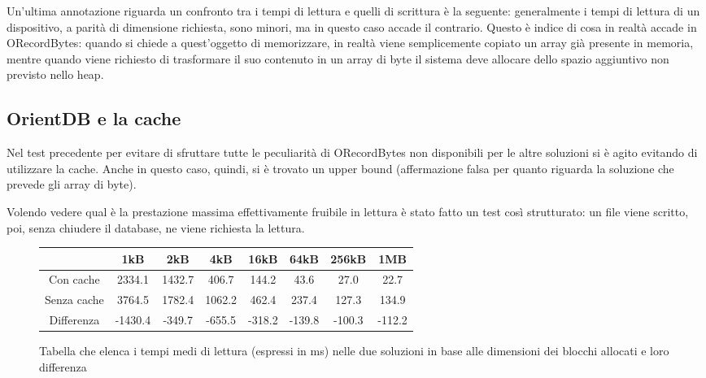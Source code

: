 Un'ultima annotazione riguarda un confronto tra i tempi di lettura e quelli di scrittura è la seguente: generalmente i tempi di lettura di un dispositivo, a parità di dimensione richiesta, sono minori, ma in questo caso accade il contrario. Questo è indice di cosa in realtà accade in ORecordBytes: quando si chiede a quest'oggetto di memorizzare, in realtà viene semplicemente copiato un array già presente in memoria, mentre quando viene richiesto di trasformare il suo contenuto in un array di byte il sistema deve allocare dello spazio aggiuntivo non previsto nello heap.

\subsection{OrientDB e la cache}
Nel test precedente per evitare di sfruttare tutte le peculiarità di ORecordBytes non disponibili per le altre soluzioni si è agito evitando di utilizzare la cache. Anche in questo caso, quindi, si è trovato un upper bound (affermazione falsa per quanto riguarda la soluzione che prevede gli array di byte).

Volendo vedere qual è la prestazione massima effettivamente fruibile in lettura è stato fatto un test così strutturato: un file viene scritto, poi, senza chiudere il database, ne viene richiesta la lettura. 

\begin{figure}
\centering
\begin{tabular}{cccccccc}
\toprule
\textbf{} & \textbf{1kB} & \textbf{2kB} & \textbf{4kB} & \textbf{16kB} & \textbf{64kB} & \textbf{256kB} & \textbf{1MB}\\
\midrule
Con cache & 2334.1 & 1432.7 & 406.7 & 144.2 & 43.6 & 27.0 & 22.7\\
Senza cache & 3764.5 & 1782.4 & 1062.2 & 462.4 & 237.4 & 127.3 & 134.9 \\
Differenza & -1430.4 & -349.7 & -655.5 & -318.2 & -139.8 & -100.3 & -112.2\\
\bottomrule
\end{tabular}
\caption{Tabella che elenca i tempi medi di lettura (espressi in ms) nelle due soluzioni in base alle dimensioni dei blocchi allocati e loro differenza}
\label{:}
\end{figure}

